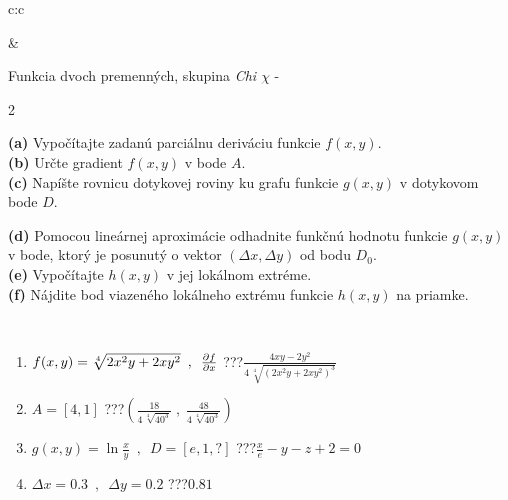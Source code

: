 \documentclass[10pt]{report}
\begin{document}
\begin{tabular}{c:c}
\begin{minipage}[c][104.5mm][t]{0.5\linewidth}
\begin{center}
\end{center}
\end{minipage}
&
\begin{minipage}[c][104.5mm][t]{0.5\linewidth}
\begin{center}
\vspace{7mm}
{\huge \LARGE Funkcia dvoch premenných, skupina \textit{Chi $\chi$} -}\\[5mm]
\begin{minipage}{0.95\linewidth}
\begin{center}
{\small \begin{multicols}{2} \raggedright
\textbf{(a)} Vypočítajte zadanú parciálnu deriváciu funkcie \(f(x,y)\). \\[1mm]
\textbf{(b)} Určte gradient \(f(x,y)\) v bode \(A\). \\[1mm]
\textbf{(c)} Napíšte rovnicu dotykovej roviny ku grafu funkcie \(g(x,y)\) v dotykovom bode \(D\). \par \columnbreak
\textbf{(d)} Pomocou lineárnej aproximácie odhadnite funkčnú hodnotu funkcie \(g(x,y)\) v bode, ktorý je posunutý o vektor \((\Delta x, \Delta y)\) od bodu \(D_0\). \\[1mm]
\textbf{(e)} Vypočítajte \(h(x,y)\) v jej lokálnom extréme. \\[1mm]
\textbf{(f)} Nájdite bod viazeného lokálneho extrému funkcie \(h(x,y)\) na priamke. \\[1mm]
\end{multicols}
}
\end{center}
\end{minipage}
\\[4mm]
\begin{minipage}{0.79\linewidth}
\begin{center}
\begin{varwidth}{\linewidth}
\begin{enumerate}
\normalsizerr
\item $f(x,y) = \sqrt[4]{2x^2y + 2xy^2}\enspace , \enspace \pdv{f}{x}$\quad \dotfill\; ???\;\dotfill \quad $\frac{4xy-2y^2}{4\,\sqrt[4]{(2x^2y+2xy^2)^{3}}}$
\item $A = [4, 1]$\quad \dotfill\; ???\;\dotfill \quad $\left( \frac{18}{4\,\sqrt[4]{40^3}} \;,\; \frac{48}{4\,\sqrt[4]{40^3}} \right)$
\item $g(x,y) = \ln\frac{x}{y} \enspace , \enspace D=[e,1,?]$\quad \dotfill\; ???\;\dotfill \quad $\frac{x}{e} - y - z + 2 = 0$
\item $\Delta x = {0.3} \enspace,\enspace \Delta y = {0.2}$\quad \dotfill\; ???\;\dotfill \quad $0.81$

\end{enumerate}
\end{varwidth}
\end{center}
\end{minipage}
\end{center}
\end{minipage}
\end{tabular}
\end{document}
